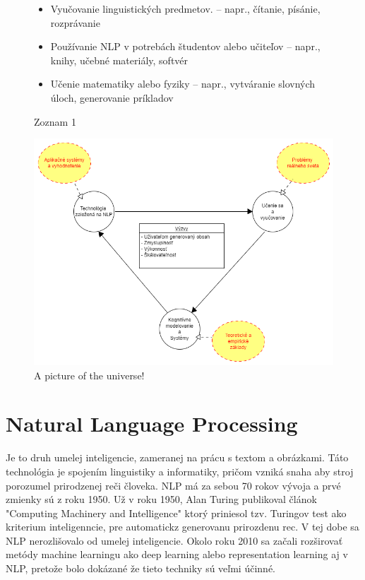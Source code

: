 \documentclass[10pt,twoside,slovak,a4paper]{article}
\begin{document}
\begin{framed}
	\centering
	\begin{figure}[H]
		\begin{itemize}\label{zoznam_1}
			\item Vyučovanie linguistických predmetov.
			– napr., čítanie, písánie, rozprávanie
			\item Používanie NLP v potrebách študentov alebo učiteľov
			– napr., knihy, učebné materiály, softvér
			\item Učenie matematiky alebo fyziky
			– napr., vytváranie slovných úloch, generovanie príkladov
		\end{itemize}
		\centering Zoznam 1
	\end{figure}
\end{framed}
\begin{framed}
	\begin{figure}[H]\label{nlp_obrazok}
		\includegraphics{nlp}
		\centering
		\caption{A picture of the universe!}
	\end{figure}
\end{framed}
\section{Natural Language Processing} \label{NLP}
\begin{flushleft}Je to druh umelej inteligencie, zameranej na prácu s textom a obrázkami.  
Táto technológia je spojením linguistiky a informatiky, 
pričom vzniká snaha aby stroj porozumel prirodzenej reči človeka.
NLP má za sebou 70 rokov vývoja a prvé zmienky sú z roku 1950\cite{historia}.
Už v roku 1950, Alan Turing publikoval článok "Computing Machinery and Intelligence"\cite{turing2009computing} 
ktorý priniesol tzv. Turingov test ako kriterium inteligenncie, pre automatickz generovanu 
prirozdenu rec. V tej dobe sa NLP nerozlišovalo od umelej inteligencie.\linebreak
Okolo roku 2010 sa začali rozširovať metódy machine learningu ako deep learning alebo 
representation learning aj v NLP, pretože bolo dokázané že tieto techniky sú veľmi účinné.
\end{flushleft}
\end{document}
